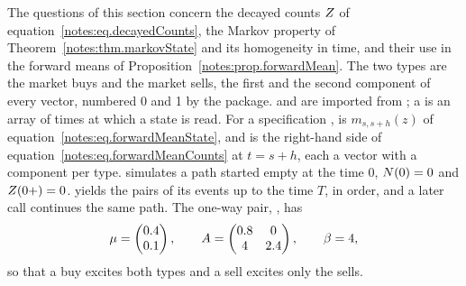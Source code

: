 The questions of this section concern the decayed counts $Z$
of equation~\eqref{notes:eq.decayedCounts},
the Markov property of Theorem~\ref{notes:thm.markovState}
and its homogeneity in time,
and their use in the forward means of Proposition~\ref{notes:prop.forwardMean}.
The two types are the market buys and the market sells,
the first and the second component of every vector,
numbered 0 and 1 by the package.
 and  are imported from ;
a  is an array of times at which a state is read.
For a specification ,
 is $m_{s,s+h}(z)$
of equation~\eqref{notes:eq.forwardMeanState},
and  is the right-hand side
of equation~\eqref{notes:eq.forwardMeanCounts} at $t = s + h$,
each a vector with a component per type.
 simulates a path started empty at the time 0,
$N(0) = 0$ and $Z(0+) = 0$.
 yields the pairs  of its events
up to the time $T$, in order,
and a later call continues the same path.
The one-way pair, , has
\begin{equation*}
 \mu = \begin{pmatrix} 0.4 \\ 0.1 \end{pmatrix},
 \qquad
 A = \begin{pmatrix} 0.8 & 0 \\ 4 & 2.4 \end{pmatrix},
 \qquad
 \beta = 4 ,
\end{equation*}
so that a buy excites both types and a sell excites only the sells.

